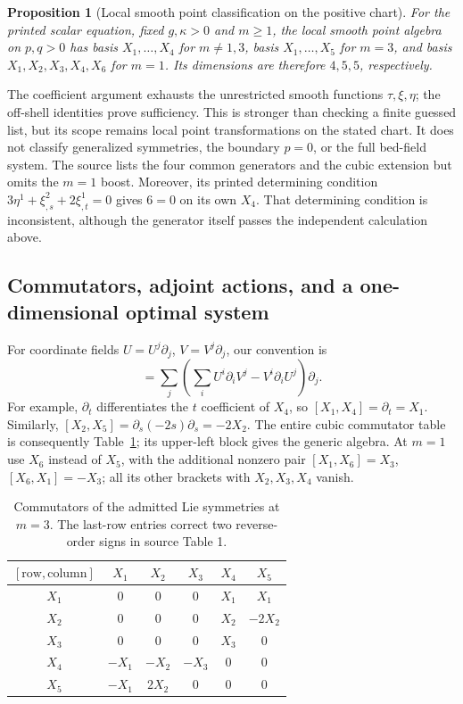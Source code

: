 \documentclass[11pt]{article}
\newtheorem{proposition}[theorem]{Proposition}
\theoremstyle{definition}
\begin{document}
\begin{proposition}[Local smooth point classification on the positive chart]
For the printed scalar equation, fixed $g,\kappa>0$ and $m\geq1$, the local
smooth point algebra on $p,q>0$ has basis $X_1,\ldots,X_4$ for $m\ne1,3$,
basis $X_1,\ldots,X_5$ for $m=3$, and basis $X_1,X_2,X_3,X_4,X_6$ for
$m=1$. Its dimensions are therefore $4,5,5$, respectively.
\end{proposition}
The coefficient argument exhausts the unrestricted smooth functions
$\tau,\xi,\eta$; the off-shell identities prove sufficiency. This is
stronger than checking a finite guessed list, but its scope remains local
point transformations on the stated chart. It does not classify generalized
symmetries, the boundary $p=0$, or the full bed-field system.
The source lists the four common generators and the cubic extension but
omits the $m=1$ boost. Moreover, its printed determining condition
$3\eta^1+\xi^2_{,s}+2\xi^1_{,t}=0$ gives $6=0$ on its own $X_4$.
That determining condition is inconsistent, although the generator itself
passes the independent calculation above.

\subsection{Commutators, adjoint actions, and a one-dimensional optimal system}
For coordinate fields $U=U^j\partial_j$, $V=V^j\partial_j$, our convention is
\begin{equation}
 [U,V]=\sum_j\left(\sum_i U^i\partial_iV^j
                          -V^i\partial_iU^j\right)\partial_j.
 \label{eq:sve-bracket-rule}
\end{equation}
For example, $\partial_t$ differentiates the $t$ coefficient of $X_4$,
so $[X_1,X_4]=\partial_t=X_1$. Similarly,
$[X_2,X_5]=\partial_s(-2s)\partial_s=-2X_2$.
The entire cubic commutator table is consequently
Table~\ref{tab:sve-repro-brackets}; its upper-left block gives the generic
algebra. At $m=1$ use $X_6$ instead of $X_5$, with the additional nonzero
pair $[X_1,X_6]=X_3$, $[X_6,X_1]=-X_3$; all its other brackets with
$X_2,X_3,X_4$ vanish.

\begin{table}[htbp]
\centering\small
\begin{tabular}{@{}c|ccccc@{}}
\toprule
$[\text{row},\text{column}]$ & $X_1$ & $X_2$ & $X_3$ & $X_4$ & $X_5$\\
\midrule
$X_1$ & $0$ & $0$ & $0$ & $X_1$ & $X_1$\\
$X_2$ & $0$ & $0$ & $0$ & $X_2$ & $-2X_2$\\
$X_3$ & $0$ & $0$ & $0$ & $X_3$ & $0$\\
$X_4$ & $-X_1$ & $-X_2$ & $-X_3$ & $0$ & $0$\\
$X_5$ & $-X_1$ & $2X_2$ & $0$ & $0$ & $0$\\
\bottomrule
\end{tabular}
\caption{Commutators of the admitted Lie symmetries at $m=3$.
The last-row entries correct two reverse-order signs in source Table 1.}
\label{tab:sve-repro-brackets}
\end{table}
\end{document}
